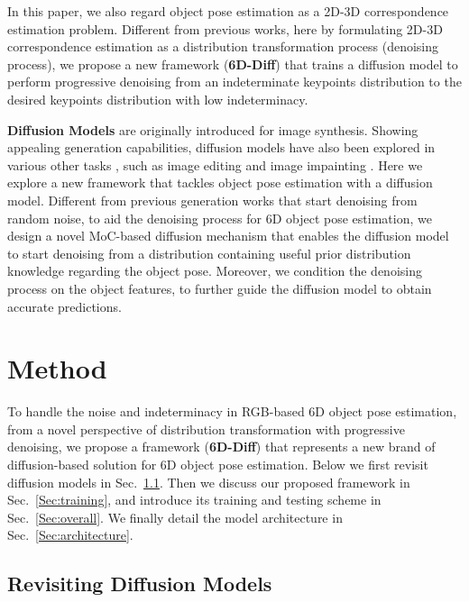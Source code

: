 \documentclass[10pt,twocolumn,letterpaper]{article}
\begin{document}
In this paper, we also regard object pose estimation as a 2D-3D correspondence estimation problem. 
Different from previous works, here by formulating 2D-3D correspondence estimation as a distribution transformation process (denoising process), 
we propose a new framework (\textbf{6D-Diff}) that trains a diffusion model to perform progressive denoising from an indeterminate keypoints distribution to the desired keypoints distribution with low indeterminacy.

\noindent\textbf{Diffusion Models} \cite{NEURIPS2020_DDPM,song2021denoising,dhariwal2021diffusion, sohl2015deep} are originally introduced for image synthesis. 
Showing appealing generation capabilities, diffusion models have also been explored in various other tasks \cite{meng2021sdedit,gu2022stochastic,lugmayr2022repaint,gong2023diffpose,urain2022se3dif,lee2023bias,hsiao2023confronting}, such as image editing \cite{meng2021sdedit} and image impainting \cite{lugmayr2022repaint}.
Here we explore a new framework that tackles object pose estimation with a diffusion model.
Different from previous generation works \cite{dhariwal2021diffusion, meng2021sdedit, lugmayr2022repaint} that start denoising from random noise, to aid the denoising process for 6D object pose estimation, we design a novel MoC-based diffusion mechanism that enables the diffusion model to start denoising from a distribution containing useful prior distribution knowledge regarding the object pose.
Moreover, we condition the denoising process on the object features, to further guide the diffusion model to obtain accurate predictions.


\section{Method}
To handle the noise and indeterminacy in RGB-based 6D object pose estimation,
from a novel perspective of distribution transformation with progressive denoising,
we propose a framework (\textbf{6D-Diff}) that represents a new brand of diffusion-based solution for 6D object pose estimation.
Below we first revisit diffusion models in Sec.~\ref{Sec:revisiting}.  
Then we discuss our proposed framework in Sec.~\ref{Sec:training}, and introduce its training and testing scheme in Sec.~\ref{Sec:overall}. 
We finally detail the model architecture in Sec.~\ref{Sec:architecture}. 

\subsection{Revisiting Diffusion Models}
\label{Sec:revisiting}
\end{document}
